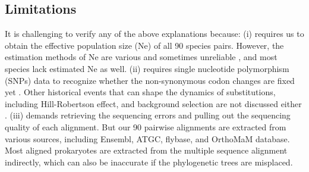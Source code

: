 \subsection{Limitations}
It is challenging to verify any of the above explanations because: (i) requires us to obtain the effective population size (Ne) of all 90 species pairs. However, the estimation methods of Ne are various and sometimes unreliable \parencite{wang2016prediction}, and most species lack estimated Ne as well. (ii) requires single nucleotide polymorphism (SNPs) data to recognize whether the non-synonymous codon changes are fixed yet \parencite{ochman2003neutral}. Other historical events that can shape the dynamics of substitutions, including Hill-Robertson effect, and background selection are not discussed either \parencite{comeron2008hill}. (iii) demands retrieving the sequencing errors and pulling out the sequencing quality of each alignment. But our 90 pairwise alignments are extracted from various sources, including Ensembl, ATGC, flybase, and OrthoMaM database. Most aligned prokaryotes are extracted from the multiple sequence alignment indirectly, which can also be inaccurate if the phylogenetic trees are misplaced. 

   











%
%
